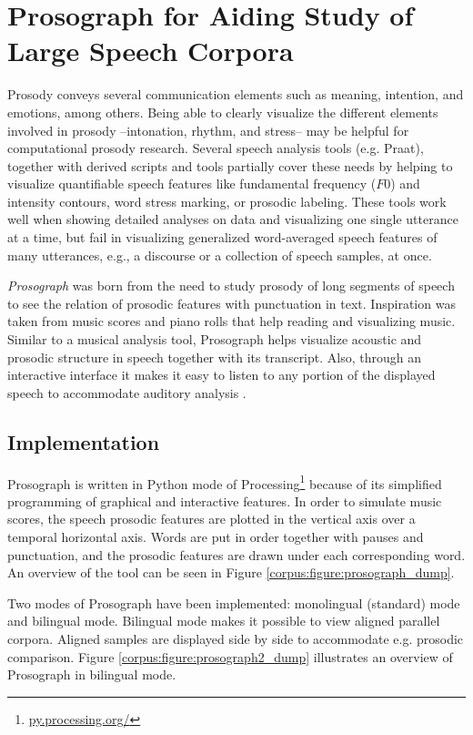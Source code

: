 \section{Prosograph for Aiding Study of Large Speech Corpora}
\label{corpusWorks:prosograph}
Prosody conveys several communication elements such as meaning, intention, and emotions, among others. Being able to clearly visualize the different elements involved in prosody --intonation, rhythm, and stress-- may be helpful for computational prosody research. Several speech analysis tools (e.g. Praat), together with derived scripts and tools \citep{ProsodyPro,mertens2004prosogram,praatontheweb} partially cover these needs by helping to visualize quantifiable speech features like fundamental frequency ($F0$) and intensity contours, word stress marking, or prosodic labeling. These tools work well when showing detailed analyses on data and visualizing one single utterance at a time, but fail in visualizing generalized word-averaged speech features of many utterances, e.g., a discourse or a collection of speech samples, at once.

\textit{Prosograph} was born from the need to study prosody of long segments of speech to see the relation of prosodic features with punctuation in text. Inspiration was taken from music scores and piano rolls that help reading and visualizing music. Similar to a musical analysis tool, Prosograph helps visualize acoustic and prosodic structure in speech together with its transcript. Also, through an interactive interface it makes it easy to listen to any portion of the displayed speech to accommodate auditory analysis \citep{prosograph}. 

\subsection{Implementation}

Prosograph is written in Python mode of Processing\footnote{\url{py.processing.org/}} because of its simplified programming of graphical and interactive features. In order to simulate music scores, the speech prosodic features are plotted in the vertical axis over a temporal horizontal axis. Words are put in order together with pauses and punctuation, and the prosodic features are drawn under each corresponding word. An overview of the tool can be seen in Figure \ref{corpus:figure:prosograph_dump}.

Two modes of Prosograph have been implemented: monolingual (standard) mode and bilingual mode. Bilingual mode makes it possible to view aligned parallel corpora. Aligned samples are displayed side by side to accommodate e.g. prosodic comparison. Figure \ref{corpus:figure:prosograph2_dump} illustrates an overview of Prosograph in bilingual mode. 

